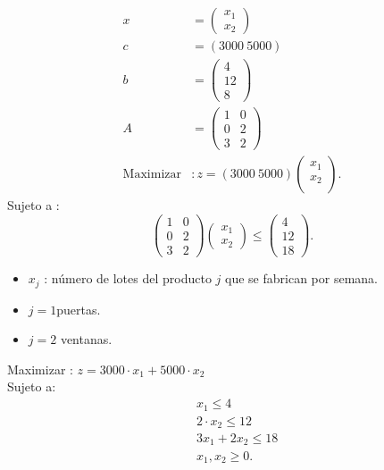 \documentclass{article}
\begin{document}
\begin{align*}
    x &= \begin{pmatrix}
        x_1\\
        x_2
    \end{pmatrix}\\
        c &= \left( 3000 \ 5000 \right) \\
        b &= \begin{pmatrix} 
            4 \\
            12 \\
            8
        \end{pmatrix}\\
        A &=  
        \begin{pmatrix}
            1 & 0 \\
            0 & 2 \\
            3 & 2 
        \end{pmatrix}\\
        \text{Maximizar} &:z = ( 3000 \ 5000) \begin{pmatrix}
            x_1 \\
            x_2\\
        \end{pmatrix}
.\end{align*}
Sujeto a :
\[
        \begin{pmatrix}
            1 & 0 \\
            0 & 2 \\
            3 & 2 
        \end{pmatrix}
        \begin{pmatrix}
        x_1\\
        x_2
    \end{pmatrix} \le  \begin{pmatrix}
    4 \\
    12 \\
    18
\end{pmatrix}
.\] 
\begin{itemize}
    \item[] \( x_j  \) : número de lotes del producto \( j \) que se fabrican por semana.
        \item[] \( j = 1 \)puertas.
            \item[] \( j = 2 \) ventanas.
\end{itemize}
Maximizar : \( z = 3000\cdot x_1 + 5000 \cdot  x_2\)\\
Sujeto  a:
\begin{align*}
  & x_1 \le   4 \\
    & 2 \cdot x_2 \le  12 \\
    & 3 x_1 + 2 x_2 \le  18 \\
    & x_1 , x_2 \ge  0
.\end{align*}
\end{document}
